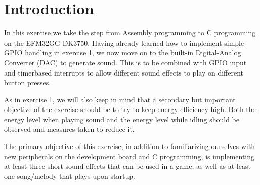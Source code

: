 \chapter{Introduction}

In this exercise we take the step from Assembly programming to C programming on the EFM32GG-DK3750. Having already learned how to implement simple GPIO handling in exercise 1, we now move on to the built-in Digital-Analog Converter (DAC) to generate sound. This is to be combined with GPIO input and timerbased interrupts to allow different sound effects to play on different button presses.

As in exercise 1, we will also keep in mind that a secondary but important objective of the exercise should be to try to keep energy efficiency high. Both the energy level when playing sound and the energy level while idling should be observed and measures taken to reduce it.

The primary objective of this exercise, in addition to familiarizing ourselves with new peripherals on the development board and C programming, is implementing at least three short sound effects that can be used in a game, as well as at least one song/melody that plays upon startup.
